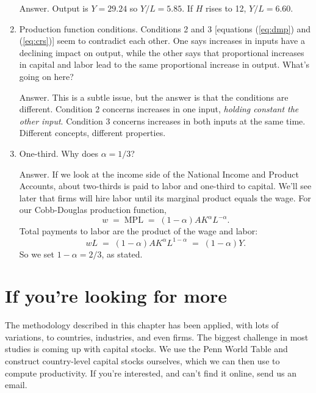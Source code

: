 \begin{enumerate}
Answer.  Output is $Y = 29.24$ so $Y/L = 5.85$.  If $H$ rises to 12,
$Y/L = 6.60 $.

\item Production function conditions.
Conditions 2 and 3 [equations (\ref{eq:dmp}) and (\ref{eq:crs})]
seem to contradict each other.
One says increases in inputs have a declining impact on output, while
the other says that proportional increases in capital and labor
lead to the same proportional increase in output.  What's going on here?

Answer.  This is a subtle issue, but the answer is that
the conditions are different.
Condition 2 concerns increases in one input,
{\it holding constant the other input\/}.
Condition 3 concerns increases in both inputs at the same time.
Different concepts, different properties.

\item One-third.  Why does $\alpha=1/3$?

Answer.  If we look at the income side of the National Income
and Product Accounts, about two-thirds is paid to labor
and one-third to capital.
We'll see later that firms will hire labor until its
marginal product   equals the wage.
For our Cobb-Douglas   production function,
\[
    w \;=\; \mbox{MPL} \;=\; (1-\alpha) A K^\alpha L^{-\alpha} .
\]
Total payments to labor are the product of the wage and labor:
\[
    w L  \;=\; (1-\alpha) A K^\alpha L^{1-\alpha} \;=\; (1-\alpha) Y.
\]
So we set $1-\alpha = 2/3$, as stated.
\end{enumerate}
\setlength{\leftmargini}{\oldleftmargini}

\section*{If you're looking for more}

The methodology described in this chapter has been applied,
with lots of variations,
to countries, industries, and even firms.
The biggest challenge in most studies is coming up with capital stocks.
We use the Penn World Table and construct country-level capital stocks ourselves,
which we can then use to compute productivity.
If you're interested, and can't find it online, send us an email.

